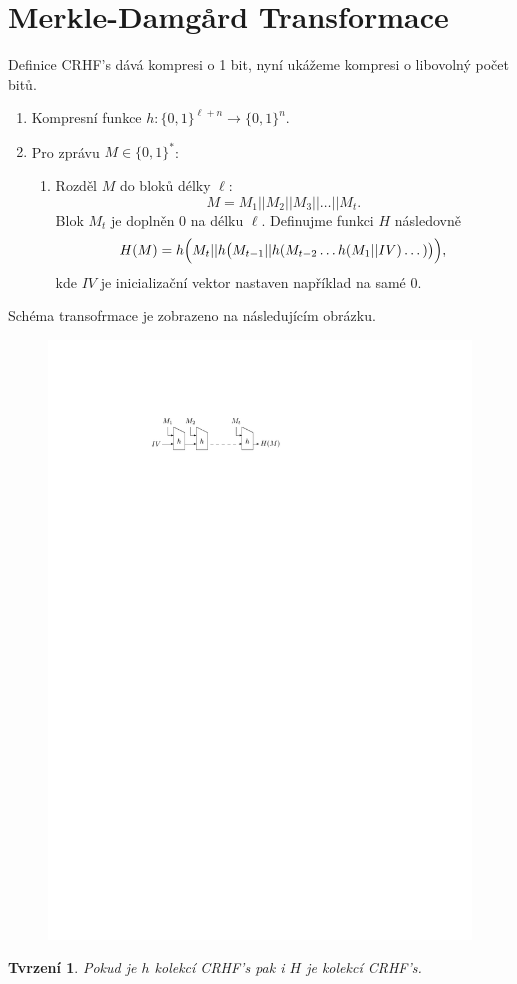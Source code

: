 \documentclass{article}
\newtheorem{proposition}{Tvrzení}
\begin{document}
\section{Merkle-Damgård Transformace}
\noindent Definice CRHF's dává kompresi o 1 bit, nyní ukážeme kompresi o libovolný počet bitů.
\begin{enumerate}
\item Kompresní funkce $h: \{0,1\}^{\ell + n} \to \{0,1\}^n$.
\item Pro zprávu $M \in \{0,1\}^*$:
\begin{enumerate}
\item Rozděl $M$ do bloků délky $\ell$:
\[
M = M_1 || M_2 || M_3 || \dots || M_t.
\]
Blok $M_t$ je doplněn 0 na délku $\ell$.
Definujme funkci $H$ následovně
\[
H(M) = h\Bigl(M_t || h\bigl(M_{t-1} || h(M_{t-2} \dots h(M_1 || IV) \dots)\bigr)\Bigr),
\]
kde $IV$ je inicializační vektor nastaven například na samé 0.
\end{enumerate}
\end{enumerate}
Schéma transofrmace je zobrazeno na následujícím obrázku.
\begin{figure}[h]
\centering
\includegraphics{MD_transformace.pdf}
\end{figure}
\begin{proposition}
Pokud je $h$ kolekcí CRHF's pak i $H$ je kolekcí CRHF's.
\end{proposition}
\end{document}
